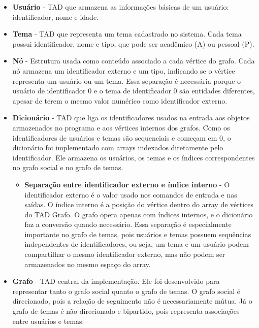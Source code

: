 \documentclass[12pt,a4paper]{article}
\begin{document}
\begin{itemize}
    \item \textbf{Usuário} - TAD que armazena as informações básicas de um usuário:
    identificador, nome e idade.

    \item \textbf{Tema} - TAD que representa um tema cadastrado no sistema. Cada tema
    possui identificador, nome e tipo, que pode ser acadêmico (A) ou pessoal (P).

    \item \textbf{Nó} - Estrutura usada como conteúdo associado a cada vértice do grafo.
    Cada nó armazena um identificador externo e um tipo, indicando se o vértice representa
    um usuário ou um tema. Essa separação é necessária porque o usuário de identificador
    0 e o tema de identificador 0 são entidades diferentes, apesar de terem o mesmo valor
    numérico como identificador externo.

    \item \textbf{Dicionário} - TAD que liga os identificadores usados na
    entrada aos objetos armazenados no programa e aos vértices internos dos grafos. Como
    os identificadores de usuários e temas são sequenciais e começam em 0, o dicionário foi
    implementado com arrays indexados diretamente pelo identificador. Ele armazena os
    usuários, os temas e os índices correspondentes no grafo social e no grafo de temas.

    \begin{itemize}
        \item \textbf{Separação entre identificador externo e índice interno} - O
        identificador externo é o valor usado nos comandos de entrada e nas saídas. O
        índice interno é a posição do vértice dentro do array de vértices do TAD Grafo. O
        grafo opera apenas com índices internos, e o dicionário faz a conversão quando
        necessário. Essa separação é especialmente importante no grafo de temas, pois
        usuários e temas possuem sequências independentes de identificadores, ou seja, um tema e um usuário podem compartilhar o mesmo identificador externo, mas não podem ser armazenados no mesmo espaço do array.
    \end{itemize}

    \item \textbf{Grafo} - TAD central da implementação. Ele foi desenvolvido para
    representar tanto o grafo social quanto o grafo de temas. O grafo social é direcionado,
    pois a relação de seguimento não é necessariamente mútua. Já o grafo de temas é não
    direcionado e bipartido, pois representa associações entre usuários e temas.


\end{itemize}
\end{document}
